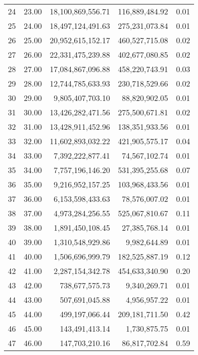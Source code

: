 \begin{table}[ht]
\begin{tabular}{rrrrr}
  24 & 23.00 & 18,100,869,556.71 & 116,889,484.92 & 0.01 \\ 
  25 & 24.00 & 18,497,124,491.63 & 275,231,073.84 & 0.01 \\ 
  26 & 25.00 & 20,952,615,152.17 & 460,527,715.08 & 0.02 \\ 
  27 & 26.00 & 22,331,475,239.88 & 402,677,080.85 & 0.02 \\ 
  28 & 27.00 & 17,084,867,096.88 & 458,220,743.91 & 0.03 \\ 
  29 & 28.00 & 12,744,785,633.93 & 230,718,529.66 & 0.02 \\ 
  30 & 29.00 & 9,805,407,703.10 & 88,820,902.05 & 0.01 \\ 
  31 & 30.00 & 13,426,282,471.56 & 275,500,671.81 & 0.02 \\ 
  32 & 31.00 & 13,428,911,452.96 & 138,351,933.56 & 0.01 \\ 
  33 & 32.00 & 11,602,893,032.22 & 421,905,575.17 & 0.04 \\ 
  34 & 33.00 & 7,392,222,877.41 & 74,567,102.74 & 0.01 \\ 
  35 & 34.00 & 7,757,196,146.20 & 531,395,255.68 & 0.07 \\ 
  36 & 35.00 & 9,216,952,157.25 & 103,968,433.56 & 0.01 \\ 
  37 & 36.00 & 6,153,598,433.63 & 78,576,007.02 & 0.01 \\ 
  38 & 37.00 & 4,973,284,256.55 & 525,067,810.67 & 0.11 \\ 
  39 & 38.00 & 1,891,450,108.45 & 27,385,768.14 & 0.01 \\ 
  40 & 39.00 & 1,310,548,929.86 & 9,982,644.89 & 0.01 \\ 
  41 & 40.00 & 1,506,696,999.79 & 182,525,887.19 & 0.12 \\ 
  42 & 41.00 & 2,287,154,342.78 & 454,633,340.90 & 0.20 \\ 
  43 & 42.00 & 738,677,575.73 & 9,340,269.71 & 0.01 \\ 
  44 & 43.00 & 507,691,045.88 & 4,956,957.22 & 0.01 \\ 
  45 & 44.00 & 499,197,066.44 & 209,181,711.50 & 0.42 \\ 
  46 & 45.00 & 143,491,413.14 & 1,730,875.75 & 0.01 \\ 
  47 & 46.00 & 147,703,210.16 & 86,817,702.84 & 0.59 \\ 
   \hline
\end{tabular}
\end{table}
